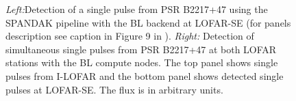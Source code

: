 \documentclass{aastex63}
\begin{document}
\begin{figure}
    \centering
    \caption{{\itshape Left:}Detection of a single pulse from PSR B2217+47 using the SPANDAK pipeline with the BL backend at LOFAR-SE (for panels description see caption in Figure 9 in \citealt{Gajjar_2021_BLGC1}). {\itshape Right:} Detection of simultaneous single pulses from PSR B2217+47 at both LOFAR stations with the BL compute nodes. The top panel shows single pulses from I-LOFAR and the bottom panel shows detected single pulses at LOFAR-SE. The flux is in arbitrary units.}
    \label{fig:sp_2217}
\end{figure}
\end{document}
